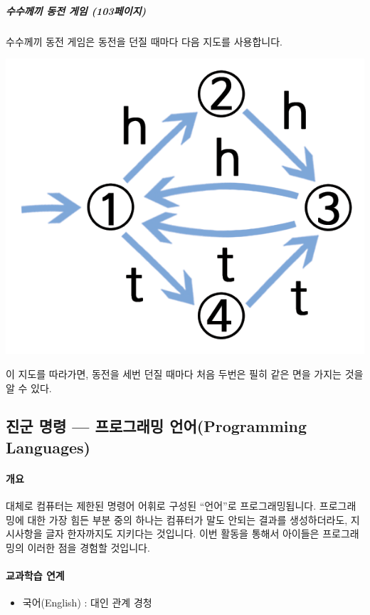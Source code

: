\documentclass[]{article}
\begin{document}
\subparagraph{수수께끼 동전 게임 (103페이지)}\label{section-171}

수수께끼 동전 게임은 동전을 던질 때마다 다음 지도를 사용합니다.

\includegraphics{csunplugged/03-part/img/ch12-fsm/11-fsm-08-coin-toss.png}

이 지도를 따라가면, 동전을 세번 던질 때마다 처음 두번은 필히 같은 면을
가지는 것을 알 수 있다.

\subsection{진군 명령 --- 프로그래밍 언어(Programming
Languages)}\label{mdash--programming-languages}

\mbox{}\paragraph{개요}\label{section-172}

대체로 컴퓨터는 제한된 명령어 어휘로 구성된 ``언어''로 프로그래밍됩니다.
프로그래밍에 대한 가장 힘든 부분 중의 하나는 컴퓨터가 말도 안되는 결과를
생성하더라도, 지시사항을 글자 한자까지도 지키다는 것입니다. 이번 활동을
통해서 아이들은 프로그래밍의 이러한 점을 경험할 것입니다.

\mbox{}\paragraph{교과학습 연계}\label{section-173}

\begin{itemize}
\itemsep1pt\parskip0pt
\item
  국어(English) : 대인 관계 경청
\end{itemize}
\end{document}
